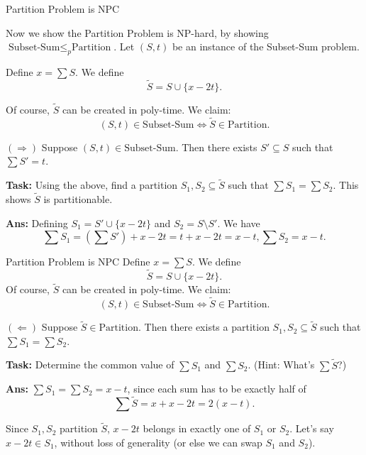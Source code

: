\documentclass{beamer}
\begin{document}
\begin{frame}{Partition Problem is NPC}

Now we show the Partition Problem is NP-hard, by showing $\text{Subset-Sum} \leq_p \text{Partition}$. Let $(S, t)$ be an instance of the Subset-Sum problem.


\pause

Define $x = \sum S$. We define
$$\tilde{S} = S \cup \{x - 2t\}.$$

\pause 

Of course, $\tilde{S}$ can be created in poly-time. We claim:
$$(S, t) \in \text{Subset-Sum} \Leftrightarrow \tilde{S} \in \text{Partition}.$$

\pause \vspace{2mm}

$(\Rightarrow)$ Suppose $(S, t) \in \text{Subset-Sum}$. Then there exists $S' \subseteq S$ such that $\sum S' = t$. 

\textbf{Task:} Using the above, find a partition $S_1, S_2 \subseteq \tilde{S}$ such that $\sum S_1 = \sum S_2$. This shows $\tilde{S}$ is partitionable. \pause

\textbf{Ans:} Defining $S_1 = S' \cup \{x - 2t\}$ and $S_2 = S \setminus S'$. We have
$$\sum S_1 = (\sum S') + x - 2t = t + x - 2t = x - t, \sum S_2 = x - t.$$

\end{frame}

\begin{frame}{Partition Problem is NPC}
Define $x = \sum S$. We define
$$\tilde{S} = S \cup \{x - 2t\}.$$
Of course, $\tilde{S}$ can be created in poly-time. We claim:
$$(S, t) \in \text{Subset-Sum} \Leftrightarrow \tilde{S} \in \text{Partition}.$$

\pause \vspace{2mm}

$(\Leftarrow)$ Suppose $\tilde{S} \in \text{Partition}$. Then there exists a partition $S_1, S_2 \subseteq \tilde{S}$ such that $\sum S_1 = \sum S_2$.

\vspace{2mm} \pause

\textbf{Task:} Determine the common value of $\sum S_1$ and $\sum S_2$. (Hint: What's $\sum \tilde{S}$?)

\pause

\textbf{Ans:} $\sum S_1 = \sum S_2 = x - t$, since each sum has to be exactly half of $$\sum \tilde{S} = x + x - 2t = 2(x - t).$$

\pause \vspace{2mm}

Since $S_1, S_2$ partition $\tilde{S}$, $x - 2t$ belongs in exactly one of $S_1$ or $S_2$. Let's say $x - 2t \in S_1$, without loss of generality (or else we can swap $S_1$ and $S_2$).

\pause 

\end{frame}
\end{document}
